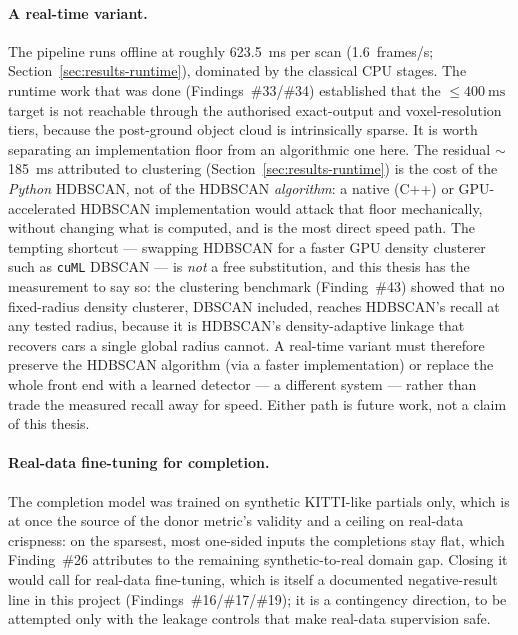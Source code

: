 \paragraph{A real-time variant.} The pipeline runs offline at roughly
\SI{623.5}{\milli\second} per scan (\num{1.6}~frames/s; Section~\ref{sec:results-runtime}), dominated by the
classical CPU stages. The runtime work that was done (Findings~\#33/\#34) established that
the $\leq\SI{400}{\milli\second}$ target is not reachable through the authorised
exact-output and voxel-resolution tiers, because the post-ground object cloud is
intrinsically sparse. It is worth separating an implementation floor from an algorithmic
one here. The residual $\sim$\SI{185}{\milli\second} attributed to clustering
(Section~\ref{sec:results-runtime}) is the cost of the \emph{Python} HDBSCAN, not of the
HDBSCAN \emph{algorithm}: a native (C++) or GPU-accelerated HDBSCAN implementation would
attack that floor mechanically, without changing what is computed, and is the most direct
speed path. The tempting shortcut --- swapping HDBSCAN for a faster GPU density clusterer
such as \texttt{cuML} DBSCAN --- is \emph{not} a free substitution, and this thesis has
the measurement to say so: the clustering benchmark (Finding~\#43) showed that no
fixed-radius density clusterer, DBSCAN included, reaches HDBSCAN's recall at any tested
radius, because it is HDBSCAN's density-adaptive linkage that recovers cars a single global
radius cannot. A real-time variant must therefore preserve the HDBSCAN algorithm (via a
faster implementation) or replace the whole front end with a learned detector --- a
different system --- rather than trade the measured recall away for speed. Either path is
future work, not a claim of this thesis.

\paragraph{Real-data fine-tuning for completion.} The completion model was trained on
synthetic KITTI-like partials only, which is at once the source of the donor metric's
validity and a ceiling on real-data crispness: on the sparsest, most one-sided inputs the
completions stay flat, which Finding~\#26 attributes to the remaining synthetic-to-real
domain gap. Closing it would call for real-data fine-tuning, which is itself a documented
negative-result line in this project (Findings~\#16/\#17/\#19); it is a contingency
direction, to be attempted only with the leakage controls that make real-data supervision
safe.

